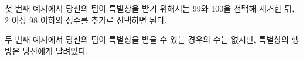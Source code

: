 첫 번째 예시에서 당신의 팀이 특별상을 받기 위해서는 99와 100을 선택해 제거한 뒤, 2 이상 98 이하의 정수를 추가로 선택하면 된다.

두 번째 예시에서 당신의 팀이 특별상을 받을 수 있는 경우의 수는 없지만, 특별상의 행방은 당신에게 달려있다.